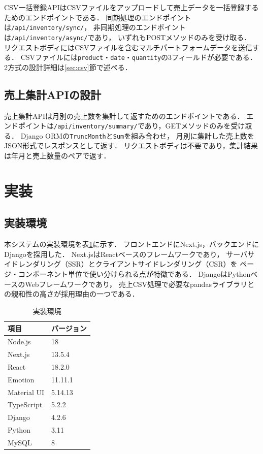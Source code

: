 \documentclass[submit,techrep]{ipsj}
\begin{document}
CSV一括登録APIはCSVファイルをアップロードして売上データを一括登録するためのエンドポイントである．
同期処理のエンドポイントは\texttt{/api/inventory/sync/}，
非同期処理のエンドポイントは\texttt{/api/inventory/async/}であり，
いずれもPOSTメソッドのみを受け取る．
リクエストボディにはCSVファイルを含むマルチパートフォームデータを送信する．
CSVファイルには\texttt{product}・\texttt{date}・\texttt{quantity}の3フィールドが必要である．
2方式の設計詳細は\ref{sec:csv}節で述べる．

\subsection{売上集計APIの設計}

売上集計APIは月別の売上数を集計して返すためのエンドポイントである．
エンドポイントは\texttt{/api/inventory/summary/}であり，GETメソッドのみを受け取る．
Django ORMの\texttt{TruncMonth}と\texttt{Sum}を組み合わせ，
月別に集計した売上数をJSON形式でレスポンスとして返す．
リクエストボディは不要であり，集計結果は年月と売上数量のペアで返す．

\section{実装}

\subsection{実装環境}

本システムの実装環境を表\ref{tab:env}に示す．
フロントエンドにNext.js\cite{nextjs-docs}，バックエンドにDjango\cite{django-docs}を採用した．
Next.jsはReact\cite{react-docs}ベースのフレームワークであり，
サーバサイドレンダリング（SSR）とクライアントサイドレンダリング（CSR）を
ページ・コンポーネント単位で使い分けられる点が特徴である．
DjangoはPythonベースのWebフレームワークであり，
売上CSV処理で必要なpandasライブラリとの親和性の高さが採用理由の一つである．

\begin{table}[H]
  \caption{実装環境}
  \label{tab:env}
  \vspace{2mm}
  \centering
  \small
  \begin{tabular}{ll}
    \hline\hline
    \textbf{項目}     & \textbf{バージョン} \\
    \hline
    Node.js           & 18 \\
    Next.js           & 13.5.4 \\
    React             & 18.2.0 \\
    Emotion           & 11.11.1 \\
    Material UI       & 5.14.13 \\
    TypeScript        & 5.2.2 \\
    Django            & 4.2.6 \\
    Python            & 3.11 \\
    MySQL             & 8 \\
    \hline
  \end{tabular}
\end{table}
\end{document}
